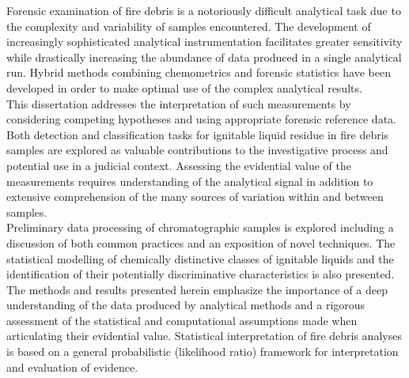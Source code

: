 \documentclass[b5paper,10pt]{letter}
\begin{document}
\thispagestyle{empty}
Forensic examination of fire debris is a notoriously difficult analytical task due to the complexity and variability of samples encountered. The development of increasingly sophisticated analytical instrumentation facilitates greater sensitivity while drastically increasing the abundance of data produced in a single analytical run. Hybrid methods combining chemometrics and forensic statistics have been developed in order to make optimal use of the complex analytical results.\\

This dissertation addresses the interpretation of such measurements by considering competing hypotheses and using appropriate forensic reference data. Both detection and classification tasks for ignitable liquid residue in fire debris samples are explored as valuable contributions to the investigative process and potential use in a judicial context. Assessing the evidential value of the measurements requires understanding of the analytical signal in addition to extensive comprehension of the many sources of variation within and between samples.\\

Preliminary data processing of chromatographic samples is explored including a discussion of both common practices and an exposition of novel techniques. The statistical modelling of chemically distinctive classes of ignitable liquids and the identification of their potentially discriminative characteristics is also presented. The methods and results presented herein emphasize the importance of a deep understanding of the data produced by analytical methods and a rigorous assessment of the statistical and computational assumptions made when articulating their evidential value. Statistical interpretation of fire debris analyses is based on a general probabilistic (likelihood ratio) framework for interpretation and evaluation of evidence.
\end{document}
